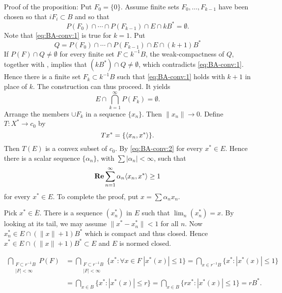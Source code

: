 \begin{enumerate}
\begin{excopy}
\begin{itemize}
Proof of the proposition: Put \(F_0 = \{0\}\).
 Assume finite sets \(F_0,\ldots,F_{k-1}\) have been
chosen so that \(iF_i \subset B\) and so that
\begin{equation} \label{eq:BA-conv:1}
P(F_0) \cap \cdots \cap P(F_{k-1}) \cap E \cap kB^* = \emptyset.
\end{equation}
Note that \eqref{eq:BA-conv:1} is true for \(k = 1\). Put
\begin{equation*}
Q = P(F_0) \cap \cdots \cap P(F_{k-1}) \cap E \cap (k+1)B^* 
\end{equation*}
If \(P(F) \cap Q \neq \emptyset\) for every finite set
 \(F \subset k^{-1}B\), the weak\upstar-compactness of $Q$,
together with , implies that \((kB^*) \cap Q \neq \emptyset\),
 which contradicts \eqref{eq:BA-conv:1}. Hence there
is a finite set \(F_k \subset k^{-1}B\) such that \eqref{eq:BA-conv:1} holds
 with \(k+1\) in place of $k$. The construction
can thus proceed. It yields
\begin{equation} \label{eq:BA-conv:2}
E \cap \bigcap_{k=1}^\infty P(F_k) = \emptyset.
\end{equation}
Arrange the members \(\cup F_k\) in a sequence \(\{x_n\}\).
 Then \(\|x_n\| \to 0\). Define \(T: X^* \to c_0\)
by
\begin{equation*}
Tx^* = \{\langle x_n,x^* \rangle\}.
\end{equation*}
Then \(T(E)\) is a convex subset of \(c_0\). By \eqref{eq:BA-conv:2}
for every \(x^* \in E\). Hence there is a scalar sequence \(\{\alpha_n\}\),
 with \(\sum |\alpha_n| < \infty\), such that
\begin{equation*}
\mathop{\bf Re}\nolimits \sum_{n=1}^\infty \alpha_n \langle x_n,x^* \rangle \geq 1
\end{equation*}
for every \(x^* \in E\). To complete the proof, put \(x = \sum \alpha_n x_n\).

\end{itemize}
\end{excopy}


\begin{itemize}

Pick \(x^*\in \overline{E}\). 
There is a sequence \((x_n^*)\) in $E$ such that \(\lim_n(x_n^*)=x\).
By looking at its tail, we may assume \(\|x^* - x_n^*\| < 1\) for all $n$.
Now \(x_n^* \in E \cap (\|x\|+1)B^*\) which is compact and thus closed.
Hence \(x^*\in E \cap (\|x\|+1)B^* \subset E\) and $E$ is normed closed.

\begin{align*}
\bigcap_{\substack{F\subset r^{-1}B \\ |F|< \infty}} P(F)
 &= \bigcap_{\substack{F\subset r^{-1}B \\ |F|< \infty}} 
    \{x^*: \forall x\in F\; |x^*(x)| \leq 1\}
 = \bigcap_{x\in r^{-1}B} \{x^*: |x^*(x)| \leq 1\} \\
 &= \bigcap_{x \in B} \{x^*:  |x^*(x)| \leq r\} 
  = \bigcap_{x \in B} \{rx^*:  |x^*(x)| \leq 1\} 
  = rB^*.
\end{align*}


\end{itemize}
\end{enumerate}
